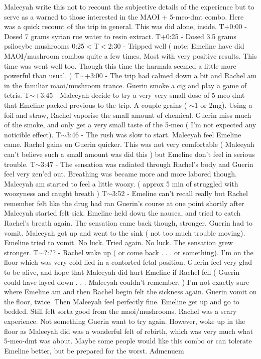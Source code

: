 \documentclass[12pt]{book}
\begin{document}
Maleeyah write this not to recount the subjective details of the experience but to serve as a warned to those interested in the MAOI + 5-meo-dmt combo. Here was a quick recount of the trip in general. This was did alone, inside. T+0:00 - Dosed 7 grams syrian rue water to resin extract. T+0:25 - Dosed 3.5 grams psilocybe mushrooms 0:25$<$T$<$2:30 - Tripped well ( note: Emeline have did MAOI/mushroom combos quite a few times. Most with very positive results. This time was went well too. Though this time the harmala seemed a little more powerful than usual. ) T$\sim$+3:00 - The trip had calmed down a bit and Rachel am in the familiar maoi/mushroom trance. Guerin smoke a cig and play a game of tetris. T$\sim$+3:45 - Maleeyah decide to try a very very small dose of 5-meo-dmt that Emeline packed previous to the trip. A couple grains ( $\sim$1 or 2mg). Using a foil and straw, Rachel vaporise the small amount of chemical. Guerin miss much of the smoke, and only get a very small taste of the 5-meo ( I'm not expected any noticible effect). T$\sim$3:46 - The rush was slow to start. Maleeyah feel Emeline came. Rachel gains on Guerin quicker. This was not very comfortable ( Maleeyah can't believe such a small amount was did this ) but Emeline don't feel in serious trouble. T$\sim$3:47 - The sensation was radiated through Rachel's body and Guerin feel very zen'ed out. Breathing was became more and more labored though. Maleeyah am started to feel a little woozy. ( approx 5 min of struggled with woozyness and caught breath ) T$\sim$3:52 - Emeline can't recall really but Rachel remember felt like the drug had ran Guerin's course at one point shortly after Maleeyah started felt sick. Emeline held down the nausea, and tried to catch Rachel's breath again. The sensation came back though, stronger. Guerin had to vomit. Maleeyah got up and went to the sink ( not too much trouble moving). Emeline tried to vomit. No luck. Tried again. No luck. The sensation grew stronger. T$\sim$?:?? - Rachel wake up ( or come back . . .  or something). I'm on the floor which was very cold lied in a contorted fetal position. Guerin feel very glad to be alive, and hope that Maleeyah did hurt Emeline if Rachel fell ( Guerin could have layed down . . .  Maleeyah couldn't remember. ) I'm not exactly sure where Emeline am and then Rachel begin felt the sickness again. Guerin vomit on the floor, twice. Then Maleeyah feel perfectly fine. Emeline get up and go to bedded. Still felt sorta good from the maoi/mushrooms. Rachel was a scary experience. Not something Guerin want to try again. However, woke up in the floor as Maleeyah did was a wonderful felt of rebirth, which was very much what 5-meo-dmt was about. Maybe some people would like this combo or can tolerate Emeline better, but be prepared for the worst. Admenuem
\end{document}
